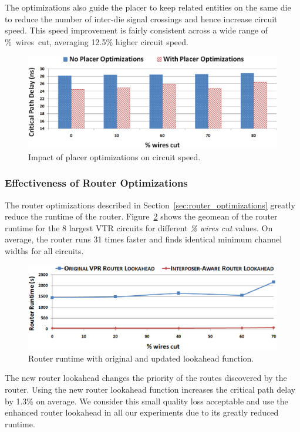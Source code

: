 \documentclass[journal]{IEEEtran}
\begin{document}
The optimizations also guide the placer to keep related entities on the same die to reduce the number of inter-die signal crossings and hence increase circuit speed. This speed improvement is fairly consistent across a wide range of \%~wires~cut, averaging 12.5\% higher circuit speed.
\begin{figure}[!htbp]
\centering
\includegraphics[width=\linewidth]{placer_opt_fmax.eps}
\caption{Impact of placer optimizations on circuit speed.}
\label{fig:comparison_fmax}
\end{figure}

\subsubsection{Effectiveness of Router Optimizations}
\label{sec:effectiveness_of_router_enhancements}
The router optimizations described in Section~\ref{sec:router_optimizations} greatly reduce the runtime of the router. Figure~\ref{fig:lookahead_runtime} shows the geomean of the router runtime for the 8 largest VTR circuits for different \textit{\% wires cut} values. On average, the router runs 31 times faster and finds identical minimum channel widths for all circuits.

\begin{figure}[!hb]
\centering
\includegraphics[width=\linewidth]{router_opt.eps}
\caption{Router runtime with original and updated lookahead function.}
\label{fig:lookahead_runtime}
\end{figure}

The new router lookahead changes the priority of the routes discovered by the router. Using the new router lookahead function increases the critical path delay by 1.3\% on average. We consider this small quality loss acceptable and use the enhanced router lookahead in all our experiments due to its greatly reduced runtime.
\end{document}
